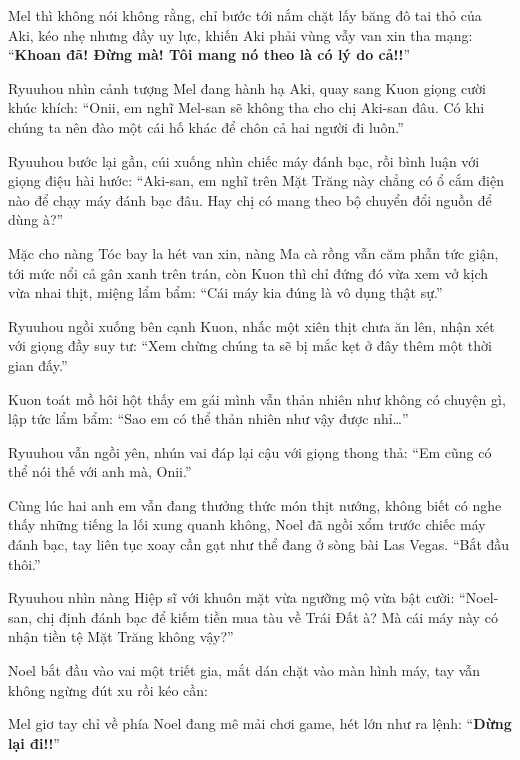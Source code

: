 \documentclass[../main.tex]{subfiles}
\begin{document}
Mel thì không nói không rằng, chỉ bước tới nắm chặt lấy băng đô tai thỏ của Aki, kéo nhẹ nhưng đầy uy lực, khiến Aki phải vùng vẫy van xin tha mạng: ``\textbf{Khoan đã! Đừng mà! Tôi mang nó theo là có lý do cả!!}''

Ryuuhou nhìn cảnh tượng Mel đang hành hạ Aki, quay sang Kuon giọng cười khúc khích: ``Onii, em nghĩ Mel-san sẽ không tha cho chị Aki-san đâu. Có khi chúng ta nên đào một cái hố khác để chôn cả hai người đi luôn.''

Ryuuhou bước lại gần, cúi xuống nhìn chiếc máy đánh bạc, rồi bình luận với giọng điệu hài hước: ``Aki-san, em nghĩ trên Mặt Trăng này chẳng có ổ cắm điện nào để chạy máy đánh bạc đâu. Hay chị có mang theo bộ chuyển đổi nguồn để dùng à?''

Mặc cho nàng Tóc bay la hét van xin, nàng Ma cà rồng vẫn căm phẫn tức giận, tới mức nổi cả gân xanh trên trán, còn Kuon thì chỉ đứng đó vừa xem vở kịch vừa nhai thịt, miệng lẩm bẩm: ``Cái máy kia đúng là vô dụng thật sự.''

Ryuuhou ngồi xuống bên cạnh Kuon, nhấc một xiên thịt chưa ăn lên, nhận xét với giọng đầy suy tư: ``Xem chừng chúng ta sẽ bị mắc kẹt ở đây thêm một thời gian đấy.''

Kuon toát mồ hôi hột thấy em gái mình vẫn thản nhiên như không có chuyện gì, lập tức lẩm bẩm: ``Sao em có thể thản nhiên như vậy được nhỉ\dots''

Ryuuhou vẫn ngồi yên, nhún vai đáp lại cậu với giọng thong thả: ``Em cũng có thể nói thế với anh mà, Onii.''

Cùng lúc hai anh em vẫn đang thưởng thức món thịt nướng, không biết có nghe thấy những tiếng la lối xung quanh không, Noel đã ngồi xổm trước chiếc máy đánh bạc, tay liên tục xoay cần gạt như thể đang ở sòng bài Las Vegas. ``Bắt đầu thôi.''

Ryuuhou nhìn nàng Hiệp sĩ với khuôn mặt vừa ngưỡng mộ vừa bật cười: ``Noel-san, chị định đánh bạc để kiếm tiền mua tàu về Trái Đất à? Mà cái máy này có nhận tiền tệ Mặt Trăng không vậy?''

Noel bắt đầu vào vai một triết gia, mắt dán chặt vào màn hình máy, tay vẫn không ngừng đút xu rồi kéo cần:


Mel giơ tay chỉ về phía Noel đang mê mải chơi game, hét lớn như ra lệnh: ``\textbf{Dừng lại đi!!}''
\end{document}
